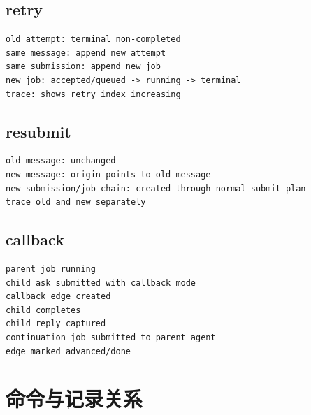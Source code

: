 \subsection{retry}

\begin{Verbatim}[fontsize=\small,frame=single]
old attempt: terminal non-completed
same message: append new attempt
same submission: append new job
new job: accepted/queued -> running -> terminal
trace: shows retry_index increasing
\end{Verbatim}

\subsection{resubmit}

\begin{Verbatim}[fontsize=\small,frame=single]
old message: unchanged
new message: origin points to old message
new submission/job chain: created through normal submit plan
trace old and new separately
\end{Verbatim}

\subsection{callback}

\begin{Verbatim}[fontsize=\small,frame=single]
parent job running
child ask submitted with callback mode
callback edge created
child completes
child reply captured
continuation job submitted to parent agent
edge marked advanced/done
\end{Verbatim}

\section{命令与记录关系}

